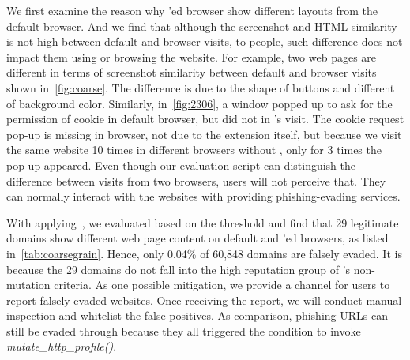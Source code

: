 We first examine the reason why \spartacus'ed browser show different layouts from the default browser.
And we find that although the screenshot and HTML similarity is not high between default and \spartacus browser visits,
to people, such difference does not impact them using or browsing the website.
For example, two web pages are different in terms of screenshot similarity between default and \spartacus browser visits shown in~\autoref{fig:coarse}.
The difference is due to the shape of buttons and different of background color.
Similarly, in~\autoref{fig:2306}, a window popped up to ask for the permission of cookie in default browser, but did not in \spartacus's visit.
The cookie request pop-up is missing in \spartacus browser, not due to the extension itself, but because we visit the same website 10 times in different browsers without \spartacus, only for 3 times the pop-up appeared.
Even though our evaluation script can distinguish the difference between visits from two browsers,
users will not perceive that.
They can normally interact with the websites with \spartacus providing phishing-evading services.




With applying~, we evaluated \spartacus based on the threshold and find that 29 legitimate domains show different web page content on default and \spartacus'ed browsers, as listed in~\autoref{tab:coarsegrain}.
Hence, only 0.04\% of 60,848 domains are falsely evaded.
It is because the 29 domains do not fall into the high reputation group of \spartacus's non-mutation criteria.
As one possible mitigation, we provide a channel for users to report falsely evaded websites.
Once receiving the report, we will conduct manual inspection and whitelist the false-positives.
As comparison, phishing URLs can still be evaded through \spartacus because they all triggered the condition to invoke \emph{mutate\_http\_profile()}.

